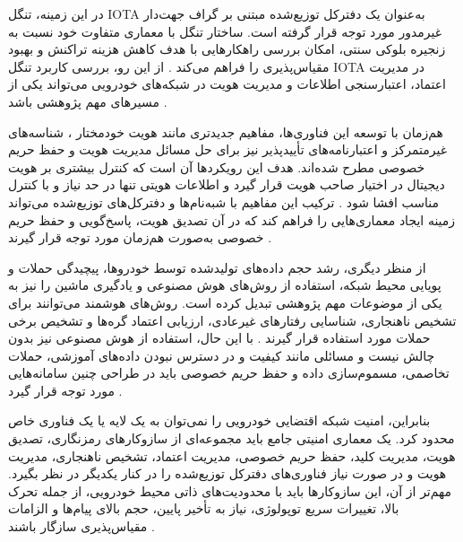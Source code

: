 در این زمینه، تنگل IOTA  به‌عنوان یک دفترکل توزیع‌شده مبتنی بر گراف جهت‌دار غیرمدور  مورد توجه قرار گرفته است. ساختار تنگل با معماری متفاوت خود نسبت به زنجیره بلوکی سنتی، امکان بررسی راهکارهایی با هدف کاهش هزینه تراکنش و بهبود مقیاس‌پذیری را فراهم می‌کند \cite{IOTATANGLE20,silvanoIotaTangleCryptocurrency2020}. از این رو، بررسی کاربرد تنگل IOTA در مدیریت اعتماد، اعتبارسنجی اطلاعات و مدیریت هویت در شبکه‌های خودرویی می‌تواند یکی از مسیرهای مهم پژوهشی باشد \cite{IOTATANGLE20,silvanoIotaTangleCryptocurrency2020,feraudoDIVADIDbasedReputation2024}.

هم‌زمان با توسعه این فناوری‌ها، مفاهیم جدیدتری مانند هویت خودمختار ، شناسه‌های غیرمتمرکز  و اعتبارنامه‌های تأییدپذیر  نیز برای حل مسائل مدیریت هویت و حفظ حریم خصوصی مطرح شده‌اند. هدف این رویکردها آن است که کنترل بیشتری بر هویت دیجیتال در اختیار صاحب هویت قرار گیرد و اطلاعات هویتی تنها در حد نیاز و با کنترل مناسب افشا شود \cite{mazzocca2025survey}. ترکیب این مفاهیم با شبه‌نام‌ها و دفترکل‌های توزیع‌شده می‌تواند زمینه ایجاد معماری‌هایی را فراهم کند که در آن تصدیق هویت، پاسخ‌گویی و حفظ حریم خصوصی به‌صورت هم‌زمان مورد توجه قرار گیرند \cite{mazzocca2025survey,feraudoDIVADIDbasedReputation2024}.

از منظر دیگری، رشد حجم داده‌های تولیدشده توسط خودروها، پیچیدگی حملات و پویایی محیط شبکه، استفاده از روش‌های هوش مصنوعی و یادگیری ماشین  را نیز به یکی از موضوعات مهم پژوهشی تبدیل کرده است. روش‌های هوشمند می‌توانند برای تشخیص ناهنجاری، شناسایی رفتارهای غیرعادی، ارزیابی اعتماد گره‌ها و تشخیص برخی حملات مورد استفاده قرار گیرند \cite{farsimadanReviewSecurityChallenges2025}. با این حال، استفاده از هوش مصنوعی نیز بدون چالش نیست و مسائلی مانند کیفیت و در دسترس نبودن داده‌های آموزشی، حملات تخاصمی، مسموم‌سازی داده و حفظ حریم خصوصی باید در طراحی چنین سامانه‌هایی مورد توجه قرار گیرد \cite{farsimadanReviewSecurityChallenges2025}.

بنابراین، امنیت شبکه اقتضایی خودرویی را نمی‌توان به یک لایه یا یک فناوری خاص محدود کرد. یک معماری امنیتی جامع باید مجموعه‌ای از سازوکارهای رمزنگاری، تصدیق هویت، مدیریت کلید، حفظ حریم خصوصی، مدیریت اعتماد، تشخیص ناهنجاری، مدیریت هویت و در صورت نیاز فناوری‌های دفترکل توزیع‌شده را در کنار یکدیگر در نظر بگیرد. مهم‌تر از آن، این سازوکارها باید با محدودیت‌های ذاتی محیط خودرویی، از جمله تحرک بالا، تغییرات سریع توپولوژی، نیاز به تأخیر پایین، حجم بالای پیام‌ها و الزامات مقیاس‌پذیری سازگار باشند \cite{farsimadanReviewSecurityChallenges2025,rahmawatiagustinaSystematicLiteratureReview2025}.


